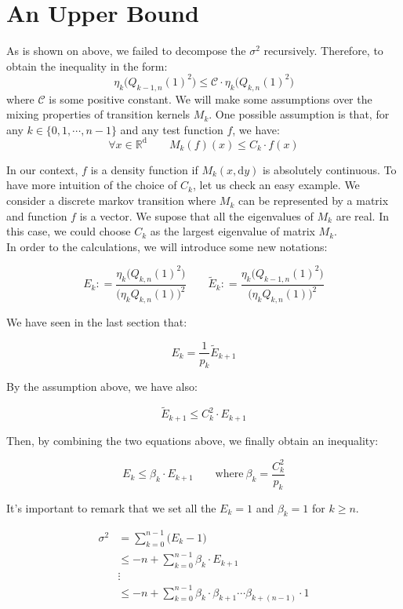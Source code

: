 \documentclass[a4paper,10pt]{article}
\begin{document}
\section{An Upper Bound}

As is shown on above, we failed to decompose the $\sigma^2$ recursively.
Therefore, to obtain the inequality in the form:
$$\eta_k \big( Q_{k-1,n}(1)^2 \big) \leq \mathcal{C}\cdot \eta_k \big( Q_{k,n}(1)^2\big)$$
where $\mathcal{C}$ is some positive constant. We will make some assumptions over the mixing properties of transition kernels $M_k$.
One possible assumption is that, for any $k \in \{0,1,\cdots,n-1\}$ and any test function $f$, we have:
$$\forall x \in \mathds{R}^{\mathrm{d}} \qquad M_k(f)(x) \leq C_k \cdot f(x)$$

In our context, $f$ is a density function if $M_k(x,\mathrm{d}y)$ is absolutely
continuous. To have more intuition of the choice of $C_k$, let us check an easy example.
We consider a discrete markov transition where $M_k$ can be represented by a
matrix and function $f$ is a vector. We supose that all the eigenvalues 
of $M_k$ are real. In this case, we could choose 
$C_k$ as the largest eigenvalue of matrix $M_k$.\\ 
In order to the calculations, we will introduce some new notations:

$$E_k : = \frac{\eta_{k} \big(Q_{k,n}(1)^2\big)}{\big(\eta_{k} Q_{k,n}(1)\big)^2}
\qquad
\tilde E_k : =  \frac{\eta_{k} \big(Q_{k-1,n}(1)^2\big)}{\big(\eta_{k} Q_{k,n}(1)\big)^2}$$ 

We have seen in the last section that:

$$E_k = \frac{1}{p_k}\tilde E_{k+1}$$

By the assumption above, we have also:

$$ \tilde E_{k+1} \leq C_k^2 \cdot E_{k+1}$$

Then, by combining the two equations above, we finally obtain an inequality:

$$E_k \leq \beta_k  \cdot E_{k+1} \qquad \text{where} \  \beta_k = \frac{C_k^2}{p_k}$$

It's important to remark that we set all the $E_k = 1$ and $\beta_k = 1$ for $k \geq n$.

\begin{equation*}
        \begin{split}
                \sigma^2 &= \sum_{k = 0}^{n-1} \big( E_k - 1\big) \\
                &\leq -n +\sum _{k=0}^{n-1} \beta_k \cdot E_{k+1}\\
                &\vdots \\
                &\leq -n + \sum_{k=0}^{n-1} \beta_k \cdot \beta_{k+1}\cdots \beta_{k+(n-1)}\cdot 1\\
        \end{split}
\end{equation*}
\end{document}
